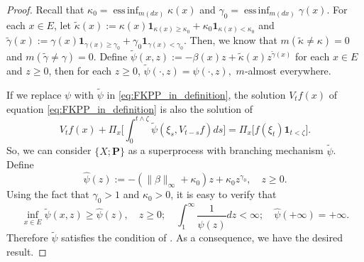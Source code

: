 \documentclass[12pt, a4paper]{amsart}
\theoremstyle{definition}
\numberwithin{equation}{section}
\begin{document}
\begin{proof}
    Recall that $\kappa_0 = \operatorname{ess\,inf}_{m(dx)} \kappa(x) $ and $\gamma_0 = \operatorname{ess\,inf}_{m(dx)} \gamma(x)$.
	For each $x\in E$, let $\tilde \kappa(x) := \kappa(x) \mathbf 1_{\kappa(x)\geq \kappa_0} + \kappa_0 \mathbf 1_{\kappa(x) < \kappa_0}$ and $\tilde \gamma(x) := \gamma(x) \mathbf 1_{\gamma(x)\geq \gamma_0} + \gamma_0 \mathbf 1_{\gamma(x) < \gamma_0}$.
    Then, we know that $m(\tilde \kappa \neq \kappa) = 0$ and $m(\tilde \gamma \neq \gamma) = 0$.
	Define $\widetilde \psi(x,z) := - \beta(x)z+ \tilde \kappa(x)z^{\tilde \gamma(x)}$ for each $x\in E$ and $z\geq 0$, 
	then for each $z\geq 0$, $\widetilde \psi(\cdot, z) = \psi(\cdot , z),$ $m$-almost everywhere.

	If we replace $\psi$ with $\tilde\psi$ in \eqref{eq:FKPP_in_definition}, the solution $V_tf(x)$ of equation \eqref{eq:FKPP_in_definition} is also the solution of
\begin{equation}
	V_t f(x) + \Pi_x \Big[  \int_0^{t\wedge \zeta} \widetilde \psi (\xi_s,V_{t-s} f) ds \Big]
	=\Pi_x \big[ f(\xi_t)\mathbf 1_{t<\zeta} \big].
\end{equation}
	So, we can consider $\{X; \mathbf P\}$ as a superprocess with branching mechanism $\tilde \psi$.
	Define
\begin{equation}
	\widehat\psi(z)
	:= - (\|\beta\|_\infty +\kappa_0 )z + \kappa_0 z^{\gamma_0},
	\quad z\geq 0.
\end{equation}
	Using the fact that $\gamma_0 > 1$ and $\kappa_0 > 0$, it is easy to verify that
\begin{equation}
	\inf_{x\in E}\widetilde \psi(x,z)
	\geq \hat\psi(z),
	\quad z\geq 0;
	\quad \int_1^\infty \frac{1}{\widehat\psi(z)} dz
	< \infty;
	\quad \hat \psi(+\infty) = +\infty.
\end{equation}
	Therefore $\widetilde \psi$ satisfies the condition of \cite[Lemma 2.3]{RenSongZhang2015Limit}.
	As a consequence, we have the desired result.
\end{proof}
\end{document}
